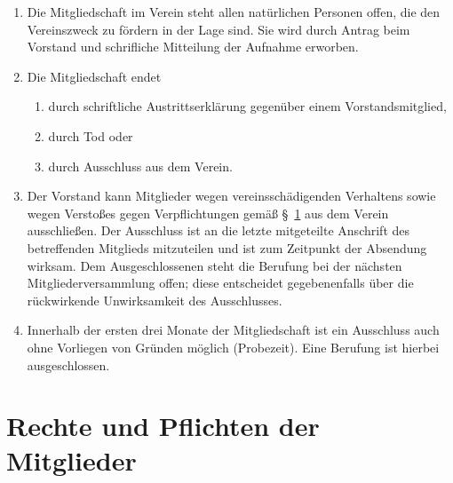 \documentclass[a4paper, 10pt, headings=normal]{scrartcl}
\begin{document}
\begin{multicols}{2}
\begin{enumerate}[label={(\arabic*)}]
	\item
		Die Mitgliedschaft im Verein steht allen natürlichen Personen offen, die den Vereinszweck zu fördern in der Lage sind.
		Sie wird durch Antrag beim Vorstand und schrifliche Mitteilung der Aufnahme erworben.
	\item
		Die Mitgliedschaft endet
		\begin{enumerate}[label={\arabic*.}]
			\item
				durch schriftliche Austrittserklärung gegenüber einem Vorstandsmitglied,
			\item
				durch Tod oder
			\item
				durch Ausschluss aus dem Verein.
		\end{enumerate}
	\item
		Der Vorstand kann Mitglieder wegen vereinsschädigenden Verhaltens sowie wegen Verstoßes gegen Verpflichtungen gemäß §~\ref{par:rechte-pflichten-mitglieder} aus dem Verein ausschließen.
		Der Ausschluss ist an die letzte mitgeteilte Anschrift des betreffenden Mitglieds mitzuteilen und ist zum Zeitpunkt der Absendung wirksam.
		Dem Ausgeschlossenen steht die Berufung bei der nächsten Mitgliederversammlung offen; diese entscheidet gegebenenfalls über die rückwirkende Unwirksamkeit des Ausschlusses.
	\item
		Innerhalb der ersten drei Monate der Mitgliedschaft ist ein Ausschluss auch ohne Vorliegen von Gründen möglich (Probezeit). Eine Berufung ist hierbei ausgeschlossen.
\end{enumerate}

\section{Rechte und Pflichten der Mitglieder}
\label{par:rechte-pflichten-mitglieder}


\end{multicols}
\end{document}

